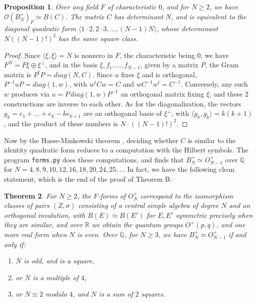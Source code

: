 \documentclass[11pt]{amsart}
\newtheorem{theorem}{Theorem}[section]
\newtheorem{proposition}[theorem]{Proposition}
\theoremstyle{definition}
\begin{document}
\begin{proposition}
\label{p36}
Over any field $F$ of characteristic $0$, and for $N\geq2$, we have $\mathcal O(B_N^+)_F\simeq B(C)$. The matrix $C$ has determinant $N$, and is equivalent to the diagonal quadratic form $\langle1\cdot2,2\cdot3,\ldots,(N-1)N\rangle$, whose determinant $N((N-1)!)^2$ has the same square class.
\end{proposition}

\begin{proof}
Since $\langle\xi,\xi\rangle=N$ is nonzero in $F$, the characteristic being $0$, we have $F^N=F\xi\oplus\xi^\perp$, and in the basis $\xi,f_1,\ldots,f_{N-1}$, given by a matrix $P$, the Gram matrix is $P^tP=diag(N,C)$. Since $u$ fixes $\xi$ and is orthogonal, $P^{-1}uP=diag(1,w)$, with $w^tCw=C$ and $wC^{-1}w^t=C^{-1}$. Conversely, any such $w$ produces via $u=P\,diag(1,w)P^{-1}$ an orthogonal matrix fixing $\xi$, and these 2 constructions are inverse to each other. As for the diagonalization, the vectors $g_k=e_1+\ldots+e_k-ke_{k+1}$ are an orthogonal basis of $\xi^\perp$, with $\langle g_k,g_k\rangle=k(k+1)$, and the product of these numbers is $N\cdot((N-1)!)^2$.
\end{proof}

Now by the Hasse-Minkowski theorem \cite{se2}, deciding whether $C$ is similar to the identity quadratic form reduces to a computation with the Hilbert symbols. The program {\tt forms.py} does these computations, and finds that $B_N^+\simeq O_{N-1}^+$ over $\mathbb Q$ for $N=4,8,9,10,12,16,18,20,24,25,\ldots$ In fact, we have the following clean statement, which is the end of the proof of Theorem B:

\begin{theorem}
\label{t37}
For $N\geq2$, the $F$-forms of $O_N^+$ correspond to the isomorphism classes of pairs $(Z,\sigma)$ consisting of a central simple algebra of degree $N$ and an orthogonal involution, with $B(E)\simeq B(E')$ for $E,E'$ symmetric precisely when they are similar, and over $\mathbb R$ we obtain the quantum groups $O^+(p,q)$, and one more real form when $N$ is even. Over $\mathbb Q$, for $N\geq3$, we have $B_N^+\simeq O_{N-1}^+$ if and only if:
\begin{enumerate}
\item $N$ is odd, and is a square,

\item or $N$ is a multiple of $4$,

\item or $N\equiv2$ modulo $4$, and $N$ is a sum of $2$ squares.
\end{enumerate}
\end{theorem}
\end{document}
